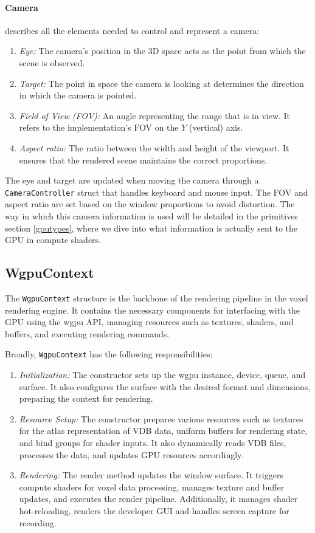 \paragraph{Camera} describes all the elements needed to control and represent a camera:
\begin{enumerate}
    \item \emph{Eye:} The camera's position in the 3D space acts as the point from which the scene is observed.
    \item \emph{Target:} The point in space the camera is looking at determines the direction in which the camera is pointed.
    \item \emph{Field of View (FOV):} An angle representing the range that is in view. It refers to the implementation's FOV on the $Y$ (vertical) axis.\label{fov:def}
    \item \emph{Aspect ratio:} The ratio between the width and height of the viewport. It ensures that the rendered scene maintains the correct proportions.
\end{enumerate}
The eye and target are updated when moving the camera through a \verb|CameraController| struct that handles keyboard and mouse input. The FOV and aspect ratio are set based on the window proportions to avoid distortion. The way in which this camera information is used will be detailed in the primitives section \cref{gputypes}, where we dive into what information is actually sent to the GPU in compute shaders.


\subsection{WgpuContext}
The \verb|WgpuContext| structure is the backbone of the rendering pipeline in the voxel rendering engine. It contains the necessary components for interfacing with the GPU using the wgpu API, managing resources such as textures, shaders, and buffers, and executing rendering commands.

Broadly, \verb|WgpuContext| has the following responsibilities:
\begin{enumerate}
  \item \emph{Initialization:} The constructor sets up the wgpu instance, device, queue, and surface.
        It also configures the surface with the desired format and dimensions, preparing the context for rendering.
  \item \emph{Resource Setup:} The constructor prepares various resources such as textures for the atlas representation of VDB data, uniform buffers for rendering state, and bind groups for shader inputs.
        It also dynamically reads VDB files, processes the data, and updates GPU resources accordingly.
  \item \emph{Rendering:} The render method updates the window surface.
        It triggers compute shaders for voxel data processing, manages texture and buffer updates, and executes the render pipeline. Additionally, it manages shader hot-reloading, renders the developer GUI and handles screen capture for recording.
\end{enumerate}

